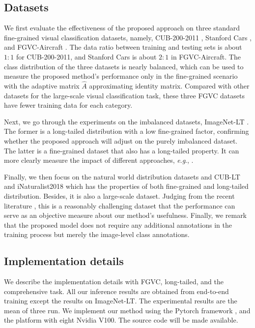 \documentclass{article}
\newcommand{\eg}{\textit{e}.\textit{g}.}
\begin{document}
\subsection{Datasets}


We first evaluate the effectiveness of the proposed approach on three standard fine-grained visual classification datasets, namely, CUB-200-2011 \cite{WahCUB_200_2011}, Stanford Cars \cite{KrauseStarkDengFei-Fei_3DRR2013}, and FGVC-Aircraft \cite{maji13fine-grained}. 
The data ratio between training and testing sets is about $1:1$ for CUB-200-2011, and Stanford Cars is about $2:1$ in FGVC-Aircraft. The class distribution of the three datasets is nearly balanced, which can be used to measure the proposed method's performance only in the fine-grained scenario with the adaptive matrix $\hat{A}$ approximating identity matrix. Compared with other datasets for the large-scale visual classification task, these three FGVC datasets have fewer training data for each category.

Next, we go through the experiments on the imbalanced datasets, ImageNet-LT \cite{DBLP:journals/corr/abs-1904-05160}. The former is a long-tailed distribution with a low fine-grained factor, confirming whether the proposed approach will adjust on the purely imbalanced dataset. The latter is a fine-grained dataset that also has a long-tailed property. It can more clearly measure the impact of different approaches, \eg, \cite{Kang2020Decoupling,dubey2018pairwise,du2020fine}.

Finally, we then focus on the natural world distribution datasets and CUB-LT \cite{samuel2021generalized} and iNaturalist2018 \cite{van2018inaturalist} 
which has the properties of both fine-grained and long-tailed distribution. Besides, it is also a large-scale dataset. Judging from the recent literature \cite{cao2019learning,Kang2020Decoupling}, this is a reasonably challenging dataset that the performance can serve as an objective measure about our method's usefulness. Finally, we remark that the proposed model does not require any additional annotations in the training process but merely the image-level class annotations.


\subsection{Implementation details}
\label{subsec:details}


We describe the implementation details with FGVC, long-tailed, and the comprehensive task. All our inference results are obtained from end-to-end training except the results on ImageNet-LT. The experimental results are the mean of three run. We implement our method using the Pytorch framework \cite{paszke2017automatic}, and the platform with eight Nvidia V100. The source code will be made available. 
\vspace{-10pt}
\end{document}
